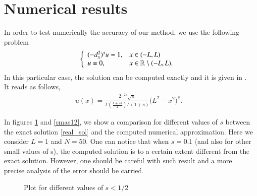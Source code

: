 \section{Numerical results} \label{res_numerical}
%
In order to test numerically the accuracy of our method, we use the following problem 
%
\begin{align}\label{PE_real}
	\left\{\begin{array}{ll}
		(-d_x^2)^{s}u = 1, & x\in(-L,L)
		\\
		u\equiv 0, & x\in\mathbb{R}\setminus(-L,L).
	\end{array}\right.
\end{align}
%
In this particular case, the solution can be computed exactly and it is given in \cite{getoor1961first}. It reads as follows, 
\begin{align}\label{real_sol}
	u(x)=\frac{2^{-2s}\sqrt{\pi}}{\Gamma\left(\frac{1+2s}{2}\right)\Gamma(1+s)}\Big(L^2-x^2\Big)^s.
\end{align}

In figures \ref{smenos12} and \ref{smas12}, we show a comparison for different values of $s$ between the exact solution \eqref{real_sol} and the computed numerical approximation. Here we consider $L=1$ and $N=50$. One can notice that when $s=0.1$ (and also for other small values of s), the computed solution is to a certain extent different from the exact solution. However, one should be careful with such result and a more precise analysis of the error should be carried. 
%
\begin{figure}[!h]
		\hspace{1cm}
	\caption{Plot for different values of $s<1/2$}
	\label{smenos12}
\end{figure}

